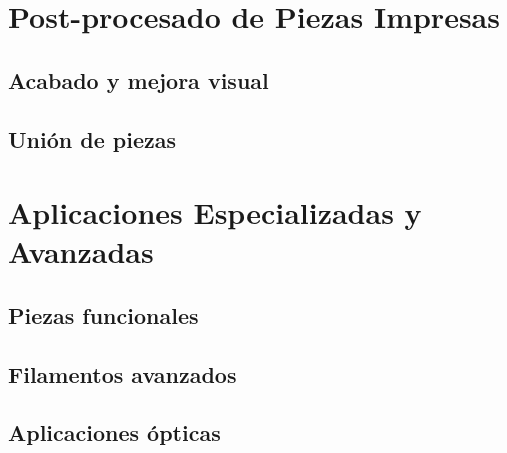 \section{Post-procesado de Piezas Impresas}

\subsection{Acabado y mejora visual}

\subsection{Unión de piezas}

\section{Aplicaciones Especializadas y Avanzadas}

\subsection{Piezas funcionales}

\subsection{Filamentos avanzados}

\subsection{Aplicaciones ópticas}

